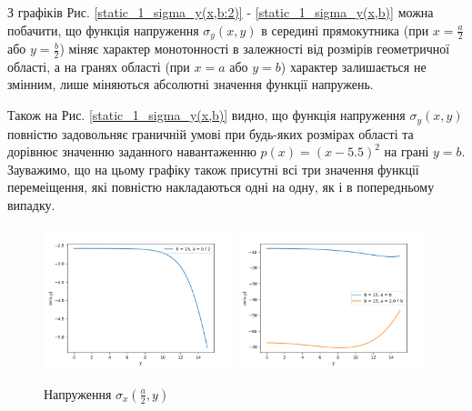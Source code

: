 З графіків Рис. \ref{static_1_sigma_y(x,b:2)} - \ref{static_1_sigma_y(x,b)} можна побачити,
що функція напруження $\sigma_y(x, y)$ в середині прямокутника (при $x=\frac{a}{2}$ або $y=\frac{b}{2}$)
міняє характер монотонності в залежності від розмірів геометричної області, а на гранях області (при $x=a$ або $y=b$)
характер залишається не змінним, лише міняються абсолютні значення функції напружень.

Також на Рис. \ref{static_1_sigma_y(x,b)} видно, що функція напруження $\sigma_y(x,y)$ повністю задовольняє граничній умові при будь-яких розмірах області
та дорівнює значенню заданного навантаженню $p(x) = (x - 5.5)^2$ на грані $y=b$.
Зауважимо, що на цьому графіку також присутні всі три значення функції перемеіщення,
які повністю накладаються одні на одну,
як і в попередньому випадку.

\begin{figure}[h!]
    \begin{center}
        \includegraphics[width=0.49\textwidth, scale=1]{images/results/static_1/sigma_x(a:2,y)1.png}
        \includegraphics[width=0.49\textwidth, scale=1]{images/results/static_1/sigma_x(a:2,y)2.png}
        \caption{Напруження $\sigma_x(\frac{a}{2}, y)$}\label{static_1_sigma_x(a:2,y)}
    \end{center}
\end{figure}

